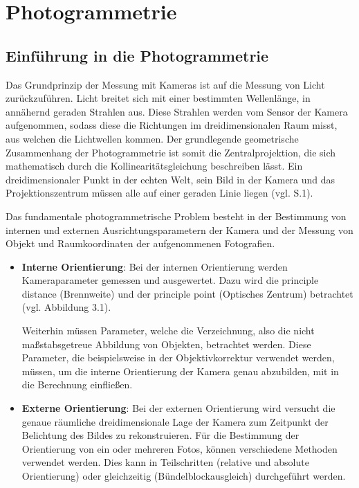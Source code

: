\chapter{Photogrammetrie}

\section{Einführung in die Photogrammetrie}

Das Grundprinzip der Messung mit Kameras ist auf die Messung von Licht zurückzuführen. Licht breitet sich mit einer bestimmten Wellenlänge, in annähernd geraden Strahlen aus. Diese Strahlen werden vom Sensor der Kamera aufgenommen, sodass diese die Richtungen im dreidimensionalen Raum misst, aus welchen die Lichtwellen kommen. Der grundlegende geometrische Zusammenhang der Photogrammetrie ist somit die Zentralprojektion, die sich mathematisch durch die Kollinearitätsgleichung beschreiben lässt. Ein dreidimensionaler Punkt in der echten Welt, sein Bild in der Kamera und das Projektionszentrum müssen alle auf einer geraden Linie liegen (vgl. \cite{fiundations_pg} S.1).

Das fundamentale photogrammetrische Problem besteht in der Bestimmung von internen und externen Ausrichtungsparametern der Kamera und der  Messung von Objekt und Raumkoordinaten der aufgenommenen Fotografien. 

\begin{itemize}
\item \textbf{Interne Orientierung}: Bei der internen Orientierung werden Kameraparameter gemessen und ausgewertet. Dazu wird die \glqq principle distance\grqq{} (Brennweite) und der \glqq principle point\grqq{} (Optisches Zentrum) betrachtet (vgl. Abbildung 3.1).

Weiterhin müssen Parameter, welche die Verzeichnung, also die nicht maßstabsgetreue Abbildung von Objekten, betrachtet werden. Diese Parameter, die beispielsweise in der Objektivkorrektur verwendet werden, müssen, um die interne Orientierung der Kamera genau abzubilden, mit in die Berechnung einfließen.

\item \textbf{Externe Orientierung}: Bei der externen Orientierung wird versucht die genaue räumliche dreidimensionale Lage der Kamera zum Zeitpunkt der Belichtung des Bildes zu rekonstruieren. Für die Bestimmung der Orientierung von ein oder mehreren Fotos, können verschiedene Methoden verwendet werden. Dies kann in Teilschritten (relative und absolute Orientierung) oder gleichzeitig (Bündelblockausgleich) durchgeführt werden. 
\end{itemize}

